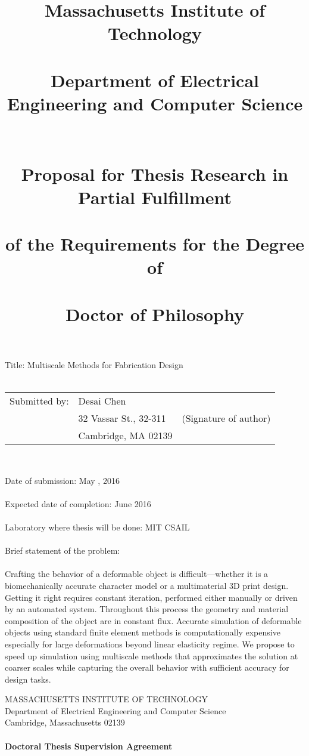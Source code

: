 \documentclass[11pt]{article}
\title{ \large{Massachusetts Institute of Technology\\~\\
	Department of Electrical Engineering and Computer Science\\~\\~\\
	Proposal for Thesis Research in Partial Fulfillment\\~\\
	of the Requirements for the Degree of\\~\\
	Doctor of Philosophy }}
\date{}
\begin{document}
	\maketitle
\begin{flushleft}
 Title: Multiscale Methods for Fabrication Design\\~\\
\end{flushleft} 
\hskip-0.2cm\begin{tabular}{p{4cm} p{6cm} p{8cm}}
 	 Submitted by: & Desai Chen & \underline{\hspace{6cm}}\\
                   &32 Vassar St., 32-311 & (Signature of author) 	  \\
                   &Cambridge, MA 02139&
\end{tabular}\\
\begin{flushleft}
Date of submission: May , 2016\\~\\
Expected date of completion: June 2016\\~\\
Laboratory where thesis will be done: MIT CSAIL\\~\\
Brief statement of the problem:\\~\\
Crafting the behavior of a deformable object is difficult---whether it is a biomechanically accurate character model or a multimaterial 3D print design.
Getting it right requires constant iteration, performed either manually or driven by an automated system.
Throughout this process the geometry and material composition of the object are in constant flux.
Accurate simulation of deformable objects using standard finite element methods is computationally expensive especially for large deformations beyond linear elasticity regime.
We propose to speed up simulation using multiscale methods that approximates the solution at coarser scales while capturing the overall behavior with sufficient accuracy for design tasks.
\end{flushleft}
\newpage
\begin{center}
	MASSACHUSETTS INSTITUTE OF TECHNOLOGY\\
	Department of Electrical Engineering and Computer Science\\
	Cambridge, Massachusetts 02139\\~\\
	\textbf{Doctoral Thesis Supervision Agreement}\\~\\
\end{center}
\end{document}
